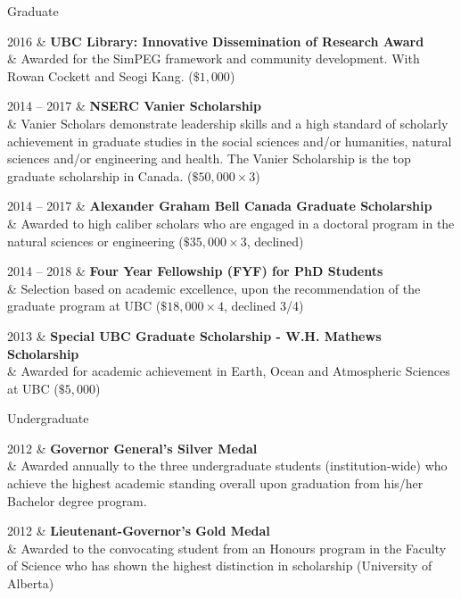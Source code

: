\documentclass[a4paper, 11pt]{article}
\newcommand{\subheading}[1]{
    \vspace{0.4cm}
    {\Large #1}\\
    \vspace{-0.2cm}
}
\begin{document}
\subheading{Graduate}
\begin{entryright}
2016 & \textbf{UBC Library: Innovative Dissemination of Research Award}   \\
& Awarded for the SimPEG framework and community development. With Rowan Cockett and Seogi Kang. ($\$1,000$)
\end{entryright}

\begin{entryright}
2014 -- 2017 & \textbf{NSERC Vanier Scholarship} \\
& Vanier Scholars demonstrate leadership skills and a high standard of scholarly achievement in graduate studies in the social sciences and/or humanities, natural sciences and/or engineering and health. The Vanier Scholarship is the top graduate scholarship in Canada. ($ \$50,000 \times 3$)
\end{entryright}

\begin{entryright}
2014 -- 2017 & \textbf{Alexander Graham Bell Canada Graduate Scholarship} \\
& Awarded to high caliber scholars who are engaged in a doctoral program in the natural sciences or engineering ($ \$35,000 \times 3$, declined)
\end{entryright}

\begin{entryright}
2014 -- 2018 & \textbf{Four Year Fellowship (FYF) for PhD Students} \\
& Selection based on academic excellence, upon the recommendation of the graduate program at UBC ($\$18,000 \times 4$, declined 3/4)
\end{entryright}

\begin{entryright}
2013 & \textbf{Special UBC Graduate Scholarship - W.H. Mathews Scholarship} \\
& Awarded for academic achievement in Earth, Ocean and Atmospheric Sciences at UBC ($\$5,000$)
\end{entryright}

\subheading{Undergraduate}
\begin{entryright}
2012 & \textbf{Governor General's Silver Medal} \\
& Awarded annually to the three undergraduate students (institution-wide) who achieve the highest academic standing overall upon graduation from his/her Bachelor degree program.
\end{entryright}

\begin{entryright}
2012 & \textbf{Lieutenant-Governor's Gold Medal} \\
& Awarded to the convocating student from an Honours program in the Faculty of Science who has shown the highest distinction in scholarship (University of Alberta)
\end{entryright}
\end{document}
